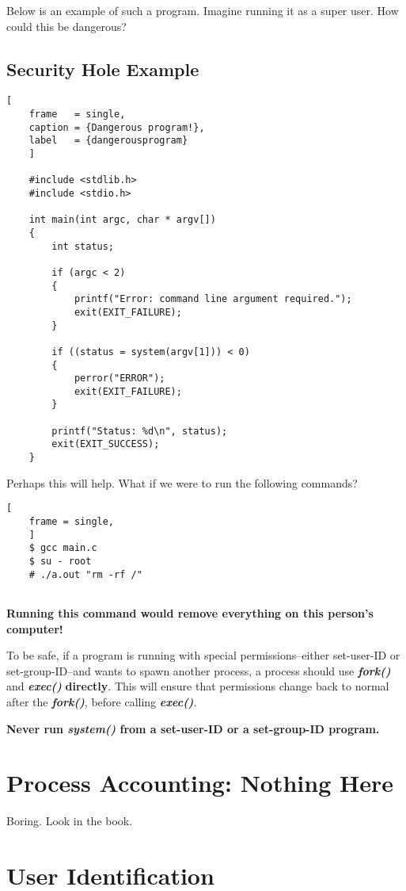 \documentclass{article}
\newcommand\be[1]{\textbf{\emph{#1}}}
\begin{document}
Below is an example of such a program. Imagine running it as a super user. How could this
be dangerous?
\subsection{Security Hole Example}
\begin{lstlisting}[
    frame   = single,
    caption = {Dangerous program!},
    label   = {dangerousprogram}
    ]

    #include <stdlib.h>
    #include <stdio.h>

    int main(int argc, char * argv[])
    {
        int status;

        if (argc < 2)
        {
            printf("Error: command line argument required.");
            exit(EXIT_FAILURE);
        }

        if ((status = system(argv[1])) < 0)
        {
            perror("ERROR");
            exit(EXIT_FAILURE);
        }

        printf("Status: %d\n", status);
        exit(EXIT_SUCCESS);
    }
\end{lstlisting}

Perhaps this will help. What if we were to run the following commands?
\begin{lstlisting}[
    frame = single,
    ]
    $ gcc main.c
    $ su - root
    # ./a.out "rm -rf /"
    
\end{lstlisting}

\textbf{Running this command would remove everything on this person's computer!}\newline

To be safe, if a program is running with special permissions--either set-user-ID or set-group-ID--and
wants to spawn another process, a process should use \be{fork()} and \be{exec()} \textbf{directly}.
This will ensure that permissions change back to normal after the \be{fork()}, before
calling \be{exec()}. \newline

\textbf{Never run \be{system()} from a set-user-ID or a set-group-ID program.}

\section{Process Accounting: Nothing Here}
Boring. Look in the book.

\newpage
\section{User Identification}
\end{document}

